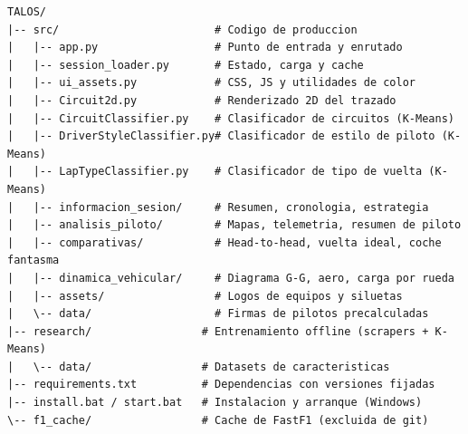 \documentclass[12pt,a4paper,twoside,openright]{book}
\begin{document}
\begin{lstlisting}[caption={Estructura de directorios del proyecto.},label=lst:tree,numbers=none]
TALOS/
|-- src/                        # Codigo de produccion
|   |-- app.py                  # Punto de entrada y enrutado
|   |-- session_loader.py       # Estado, carga y cache
|   |-- ui_assets.py            # CSS, JS y utilidades de color
|   |-- Circuit2d.py            # Renderizado 2D del trazado
|   |-- CircuitClassifier.py    # Clasificador de circuitos (K-Means)
|   |-- DriverStyleClassifier.py# Clasificador de estilo de piloto (K-Means)
|   |-- LapTypeClassifier.py    # Clasificador de tipo de vuelta (K-Means)
|   |-- informacion_sesion/     # Resumen, cronologia, estrategia
|   |-- analisis_piloto/        # Mapas, telemetria, resumen de piloto
|   |-- comparativas/           # Head-to-head, vuelta ideal, coche fantasma
|   |-- dinamica_vehicular/     # Diagrama G-G, aero, carga por rueda
|   |-- assets/                 # Logos de equipos y siluetas
|   \-- data/                   # Firmas de pilotos precalculadas
|-- research/                 # Entrenamiento offline (scrapers + K-Means)
|   \-- data/                 # Datasets de caracteristicas
|-- requirements.txt          # Dependencias con versiones fijadas
|-- install.bat / start.bat   # Instalacion y arranque (Windows)
\-- f1_cache/                 # Cache de FastF1 (excluida de git)
\end{lstlisting}
\end{document}
